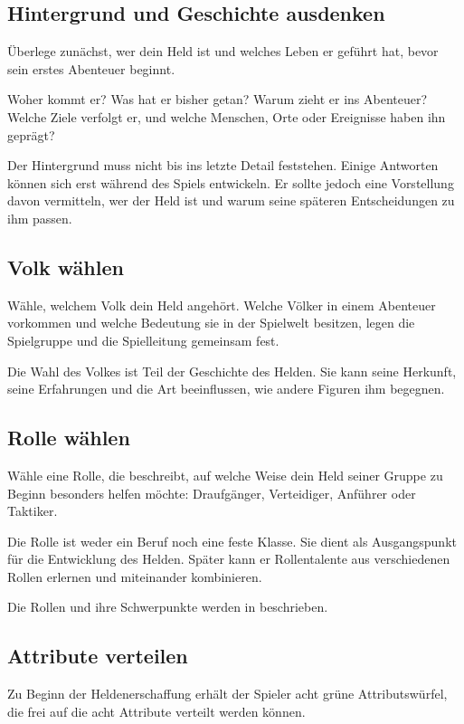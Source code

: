 \subsection{Hintergrund und Geschichte ausdenken}

Überlege zunächst, wer dein Held ist und welches Leben er geführt hat, bevor sein erstes Abenteuer beginnt.

Woher kommt er? Was hat er bisher getan? Warum zieht er ins Abenteuer? Welche Ziele verfolgt er, und welche Menschen, Orte oder Ereignisse haben ihn geprägt?

Der Hintergrund muss nicht bis ins letzte Detail feststehen. Einige Antworten können sich erst während des Spiels entwickeln. Er sollte jedoch eine Vorstellung davon vermitteln, wer der Held ist und warum seine späteren Entscheidungen zu ihm passen.

\subsection{Volk wählen}

Wähle, welchem Volk dein Held angehört. Welche Völker in einem Abenteuer vorkommen und welche Bedeutung sie in der Spielwelt besitzen, legen die Spielgruppe und die Spielleitung gemeinsam fest.

Die Wahl des Volkes ist Teil der Geschichte des Helden. Sie kann seine Herkunft, seine Erfahrungen und die Art beeinflussen, wie andere Figuren ihm begegnen.

\subsection{Rolle wählen}

Wähle eine Rolle, die beschreibt, auf welche Weise dein Held seiner Gruppe zu Beginn besonders helfen möchte: Draufgänger, Verteidiger, Anführer oder Taktiker.

Die Rolle ist weder ein Beruf noch eine feste Klasse. Sie dient als Ausgangspunkt für die Entwicklung des Helden. Später kann er Rollentalente aus verschiedenen Rollen erlernen und miteinander kombinieren.

Die Rollen und ihre Schwerpunkte werden in  beschrieben.

\subsection{Attribute verteilen}

Zu Beginn der Heldenerschaffung erhält der Spieler acht grüne Attributswürfel, die frei auf die acht Attribute verteilt werden können.

